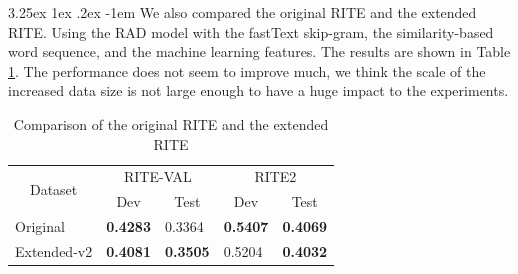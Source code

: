 \documentclass[12pt]{article}
\makeatletter
\renewcommand\paragraph{\@startsection{paragraph}{5}{\z@}%
  {3.25ex \@plus1ex \@minus.2ex}%
  {-1em}%
  {\normalfont\normalsize\bfseries}}
\makeatother
\begin{document}
\begin{CJK*}{UTF8}{bkai}
\begin{spacing}{1.77}

\paragraph{}
We also compared the original RITE and the extended RITE. Using the RAD model with the fastText skip-gram, the similarity-based word sequence, and the machine learning features. The results are shown in Table \ref{result:rite_extended}. The performance does not seem to improve much, we think the scale of the increased data size is not large enough to have a huge impact to the experiments.

\begin{table}[H]
  \centering
  \setlength{\extrarowheight}{-3pt}
  \caption{Comparison of the original RITE and the extended RITE}
  \label{result:rite_extended}
  \begin{tabular}{|l|l|l|l|l|}
  \hline
  \multicolumn{1}{|c|}{\multirow{2}{*}{Dataset}} & \multicolumn{2}{c|}{RITE-VAL} & \multicolumn{2}{c|}{RITE2} \\ \cline{2-5}
  \multicolumn{1}{|c|}{} & \multicolumn{1}{c|}{Dev} & \multicolumn{1}{c|}{Test} & \multicolumn{1}{c|}{Dev} & \multicolumn{1}{c|}{Test} \\ \hline
  Original & \textbf{0.4283} & 0.3364 & \textbf{0.5407} & \textbf{0.4069} \\ \hline
  Extended-v2 & \textbf{0.4081} & \textbf{0.3505} & 0.5204 & \textbf{0.4032} \\ \hline
  \end{tabular}
\end{table}


\end{spacing}
\end{CJK*}
\end{document}

